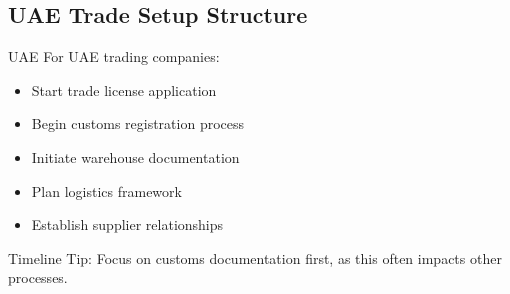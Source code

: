 \subsection{UAE Trade Setup Structure}\label{subsec:uae-setup}
\begin{regionalbox}{UAE}
For UAE trading companies:
\begin{itemize}
    \item Start trade license application
    \item Begin customs registration process
    \item Initiate warehouse documentation
    \item Plan logistics framework
    \item Establish supplier relationships
\end{itemize}

Timeline Tip: Focus on customs documentation first, as this often impacts other processes.

\end{regionalbox}

